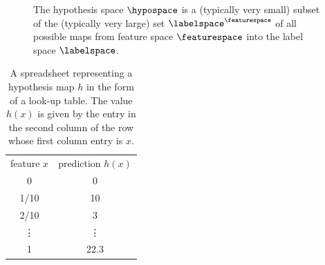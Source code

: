 \documentclass[12pt]{report}
\begin{document}
\begin{figure}[htbp]
\begin{center}
\end{center}
\caption{The hypothesis space $\hypospace$ is a (typically very small) subset of the (typically very large) 
	set $\labelspace^{\featurespace}$ of all possible maps from feature space $\featurespace$ into the label 
	space $\labelspace$.}
\label{fig_hypo_space}
\end{figure}


\vspace*{2mm}
\begin{table}
\begin{center}
\begin{tabular}{ |c|c| }
  \multicolumn{1}{c}{feature $x$}
  &  \multicolumn{1}{c}{prediction $h(x)$} \\
\cline{1-2}
 0 & 0 \\
 \cline{1-2}
 1/10 & 10 \\
 \cline{1-2}
 2/10 & 3 \\
 \cline{1-2}
 \vdots & \vdots \\
 \cline{1-2}
 1 & 22.3 \\
\cline{1-2}
\end{tabular}
\end{center}
\caption{A spreadsheet representing a hypothesis map $h$ 
	in the form of a look-up table. The value $h(x)$ is given
	by the entry in the second column of the row whose first 
	column entry is $x$.}
\label{table_lookup}
\end{table}
\vspace*{2mm}
\end{document}
